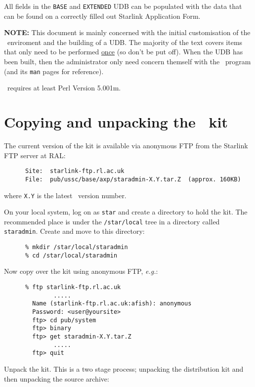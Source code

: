 All fields in the {\tt BASE} and {\tt EXTENDED} UDB can be populated with
the data that can be found on a correctly filled out Starlink Application
Form.

{\large\bf NOTE:} This document is mainly concerned with the initial
customisation of the \staradmin\ enviroment and the building of a UDB. The
majority of the text covers items that only need to be performed
\underline{once} (so don't be put off). When the UDB has been built, then
the administrator only need concern themself with the \staradmin\ program
(and its {\tt man} pages for reference).

\staradmin\ requires at least Perl Version 5.001m.


\section{Copying and unpacking the \staradmin\ kit}
\label{sec:unpack}

The current version of the kit is available via anonymous FTP from the Starlink
FTP server at RAL:

\begin{verbatim}
      Site:  starlink-ftp.rl.ac.uk
      File:  pub/ussc/base/axp/staradmin-X.Y.tar.Z  (approx. 160KB)
\end{verbatim}

where {\tt X.Y} is the latest \staradmin\ version number.

On your local system, log on as {\tt star} and create a directory to hold
the kit.  The recommended place is under the {\tt /star/local} tree in a
directory called {\tt staradmin}.  Create and move to this directory:

\begin{verbatim}
      % mkdir /star/local/staradmin
      % cd /star/local/staradmin
\end{verbatim}

Now copy over the kit using anonymous FTP, {\em e.g.}:

\begin{verbatim}
      % ftp starlink-ftp.rl.ac.uk
              .....
        Name (starlink-ftp.rl.ac.uk:afish): anonymous
        Password: <user@yoursite>
        ftp> cd pub/system
        ftp> binary
        ftp> get staradmin-X.Y.tar.Z
              .....
        ftp> quit
\end{verbatim}

Unpack the kit.  This is a two stage process; unpacking the distribution
kit and then unpacking the source archive:

